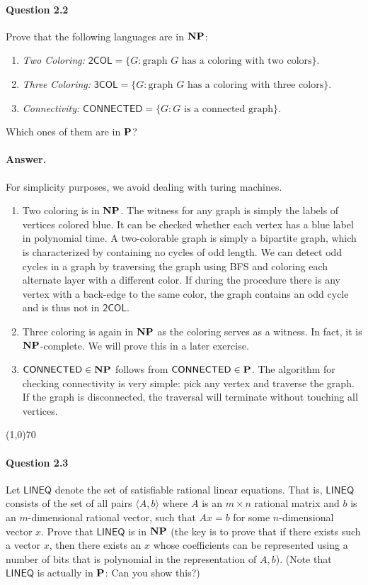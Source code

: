 \paragraph{Question 2.2} Prove that the following languages are in $\mathbf{NP}$:
\begin{enumerate}
	\item \textit{Two Coloring:} $\mathsf{2COL}=\{G:\text{graph $G$ has a coloring with two colors}\}.$
	\item \textit{Three Coloring:} $\mathsf{3COL}=\{G:\text{graph $G$ has a coloring with three colors}\}.$
	\item \textit{Connectivity:} $\mathsf{CONNECTED}=\{G:\text{$G$ is a connected graph}\}.$
\end{enumerate}
Which ones of them are in $\mathbf{P}$?

\paragraph{Answer.} For simplicity purposes, we avoid dealing with turing machines.

\begin{enumerate}
	\item Two coloring is in $\mathbf{NP}$. The witness for any graph is simply the labels of vertices colored blue. It can be checked whether each vertex has a blue label in polynomial time. A two-colorable graph is simply a bipartite graph, which is characterized by containing no cycles of odd length. We can detect odd cycles in a graph by traversing the graph using BFS and coloring each alternate layer with a different color. If during the procedure there is any vertex with a back-edge to the same color, the graph contains an odd cycle and is thus not in $\mathsf{2COL}$.
	\item Three coloring is again in $\mathbf{NP}$ as the coloring serves as a witness. In fact, it is $\mathbf{NP}$-complete. We will prove this in a later exercise.
	\item $\mathsf{CONNECTED}\in\mathbf{NP}$ follows from $\mathsf{CONNECTED}\in\mathbf{P}$. The algorithm for checking connectivity is very simple: pick any vertex and traverse the graph. If the graph is disconnected, the traversal will terminate without touching all vertices.
\end{enumerate}

\begin{center}
	\line(1,0){70}
\end{center}

\paragraph{Question 2.3} Let $\mathsf{LINEQ}$ denote the set of satisfiable rational linear equations. That is, $\mathsf{LINEQ}$ consists of the set of all pairs $\langle A,b\rangle$ where $A$ is an $m\times n$ rational matrix and $b$ is an $m$-dimensional rational vector, such that $Ax=b$ for some $n$-dimensional vector $x$. Prove that $\mathsf{LINEQ}$ is in $\mathbf{NP}$ (the key is to prove that if there exists such a vector $x$, then there exists an $x$ whose coefficients can be represented using a number of bits that is polynomial in the representation of $A, b$). (Note that $\mathsf{LINEQ}$ is actually in $\mathbf{P}$: Can you show this?)

